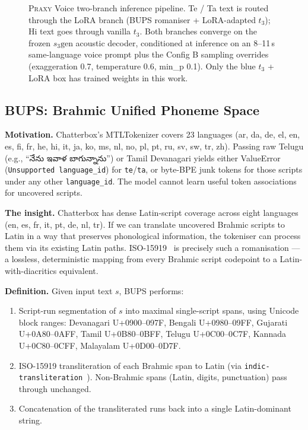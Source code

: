 \documentclass[conference,a4paper]{IEEEtran}
\newcommand{\textte}[1]{{\telugufont #1}}
\newcommand{\praxy}{\textsc{Praxy}}
\newcommand{\bups}{\textsc{BUPS}}
\newcommand{\configb}{Config B}
\begin{document}
\begin{figure}[t]
{}
\caption{\praxy{} Voice two-branch inference pipeline. Te / Ta text is routed through the LoRA branch (\bups{} romaniser + LoRA-adapted $t_3$); Hi text goes through vanilla $t_3$. Both branches converge on the frozen $s_3\text{gen}$ acoustic decoder, conditioned at inference on an 8--11\,s same-language voice prompt plus the \configb{} sampling overrides (exaggeration 0.7, temperature 0.6, min\_p 0.1). Only the blue $t_3$ + LoRA box has trained weights in this work.}
\label{fig:pipeline}
\end{figure}

\subsection{\bups{}: Brahmic Unified Phoneme Space}
\label{sec:bups}

\textbf{Motivation.} Chatterbox's MTLTokenizer covers 23 languages (ar, da, de, el, en, es, fi, fr, he, hi, it, ja, ko, ms, nl, no, pl, pt, ru, sv, sw, tr, zh). Passing raw Telugu (e.g., ``\textte{నేను ఇవాళ బాగున్నాను}'') or Tamil Devanagari yields either ValueError (\texttt{Unsupported language\_id}) for \texttt{te}/\texttt{ta}, or byte-BPE junk tokens for those scripts under any other \texttt{language\_id}. The model cannot learn useful token associations for uncovered scripts.

\textbf{The insight.} Chatterbox has dense Latin-script coverage across eight languages (en, es, fr, it, pt, de, nl, tr). If we can translate uncovered Brahmic scripts to Latin in a way that preserves phonological information, the tokeniser can process them via its existing Latin paths. ISO-15919~\cite{iso15919} is precisely such a romanisation --- a lossless, deterministic mapping from every Brahmic script codepoint to a Latin-with-diacritics equivalent.

\textbf{Definition.} Given input text $s$, \bups{} performs:
\begin{enumerate}
  \item Script-run segmentation of $s$ into maximal single-script spans, using Unicode block ranges: Devanagari U+0900--097F, Bengali U+0980--09FF, Gujarati U+0A80--0AFF, Tamil U+0B80--0BFF, Telugu U+0C00--0C7F, Kannada U+0C80--0CFF, Malayalam U+0D00--0D7F.
  \item ISO-15919 transliteration of each Brahmic span to Latin (via \texttt{indic-transliteration}~\cite{indictransliteration}). Non-Brahmic spans (Latin, digits, punctuation) pass through unchanged.
  \item Concatenation of the transliterated runs back into a single Latin-dominant string.
\end{enumerate}
\end{document}
